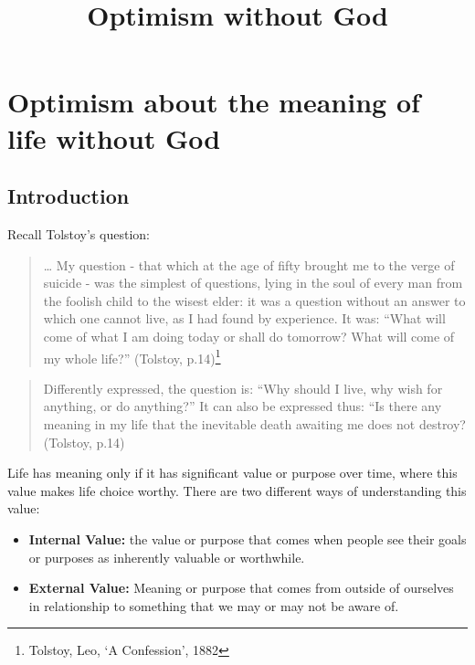 \documentclass[]{article}
\title{Optimism without God}
\date{}
\begin{document}
\maketitle

\section{Optimism about the meaning of life without
God}\label{optimism-about-the-meaning-of-life-without-god}

\subsection{Introduction}\label{introduction}

Recall Tolstoy's question:

\begin{quote}
\ldots{} My question - that which at the age of fifty brought me to the
verge of suicide - was the simplest of questions, lying in the soul of
every man from the foolish child to the wisest elder: it was a question
without an answer to which one cannot live, as I had found by
experience. It was: ``What will come of what I am doing today or shall
do tomorrow? What will come of my whole life?'' (Tolstoy,
p.14)\footnote{Tolstoy, Leo, `A Confession', 1882}
\end{quote}

\begin{quote}
Differently expressed, the question is: ``Why should I live, why wish
for anything, or do anything?'' It can also be expressed thus: ``Is
there any meaning in my life that the inevitable death awaiting me does
not destroy? (Tolstoy, p.14)
\end{quote}

Life has meaning only if it has significant value or purpose over time,
where this value makes life choice worthy. There are two different ways
of understanding this value:

\begin{itemize}
\item
  \textbf{Internal Value:} the value or purpose that comes when people
  see their goals or purposes as inherently valuable or worthwhile.
\item
  \textbf{External Value:} Meaning or purpose that comes from outside of
  ourselves in relationship to something that we may or may not be aware
  of.
\end{itemize}
\end{document}
